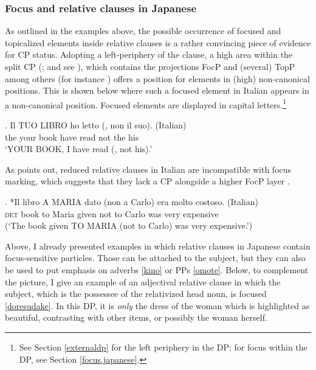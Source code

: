 \subsubsection{Focus and relative clauses in Japanese} \label{focusincp}

As outlined in the examples above, the possible occurrence of focused and topicalized elements inside relative clauses is a rather convincing piece of evidence for CP status. Adopting a left-periphery of the clause, a high area within the split CP (\citealt{rizzi:1997:the}; and see \citealt{grohmann:2003:prolific, laenzlinger:2011:elements}), which contains the projections FocP and (several) TopP among others (for instance \citealt{kiss:1998:identificational, kiss:2007:topic, aboh:2014:info}) offers a position for elements in (high) non-canonical positions. This is shown below where such a focused element in  Italian appears in a non-canonical position. Focused elements are displayed in capital letters.\footnote{See Section \ref{externaldp} for the left periphery in the DP; for focus within the DP, see Section \ref{focus,japanese}.}

\exg. Il TUO LIBRO ho letto (, non il suo). (Italian) \\
the your book have read {} not the his\\
`YOUR BOOK, I have read (, not his).’ \null \hfill \citep[286]{rizzi:1997:the}

As \citet{cinque:2020:relcl} points out, reduced relative clauses in Italian are incompatible with focus marking, which suggests that they lack a CP alongside a higher FocP layer \citep[218–219]{cinque:2020:relcl}. 

\exg. *Il libro A MARIA dato (non a Carlo) era molto costoso. (Italian)\\
\textsc{det} book to Maria given not to Carlo was very expensive\\
(`The book given TO MARIA (not to Carlo) was very expensive.’) \\ \null \hfill \citep[219]{cinque:2020:relcl}

Above, I already presented examples in which relative clauses in Japanese contain focus-sensitive particles. Those can be attached to the subject, but they can also be used to put emphasis on adverbs \ref{kino} or PPs \ref{omote}. Below, to complement the picture, I give an example of an adjectival relative clause in which the subject, which is the possessee of the relativized head noun, is focused \ref{doresudake}. In this DP, it is \textit{only} the dress of the woman which is highlighted as beautiful, contrasting with other items, or possibly the woman herself.

